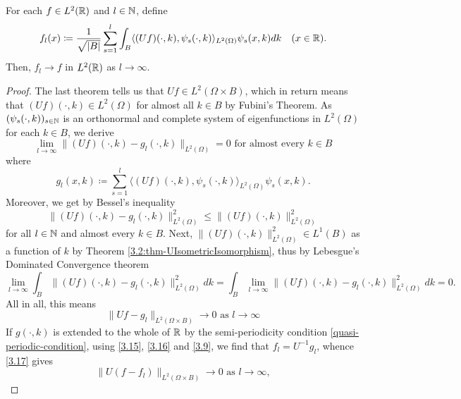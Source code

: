 \begin{theorem} \label{3.3:thm-flConvergence}
		For each $f \in L^{2}(\mathbb{R})$ and $l \in \mathbb{N}$, define
			\begin{equation}
				f_{l}(x) \coloneqq \frac{1}{\sqrt{|B|}} \sum_{s=1}^{l} \int_{B} \langle (Uf)(\cdot, k), \psi_{s}(\cdot, k) \rangle_{L^{2}(\Omega)} \psi_{s}(x, k) dk \quad (x \in \mathbb{R}). \label{3.15}
			\end{equation}
		Then, $f_{l} \rightarrow f$ in $L^{2}(\mathbb{R})$ as $l \rightarrow \infty$.

	\begin{proof}
		The last theorem tells us that $Uf \in L^{2}(\Omega \times B)$, which in return means that $(Uf)(\cdot, k) \in L^{2}(\Omega)$ for almost all $k \in B$ by Fubini's Theorem. As $(\psi_{s}(\cdot, k))_{s \in \mathbb{N}}$ is an orthonormal and complete system of eigenfunctions in $L^{2}(\Omega)$ for each $k \in B$, we derive
			\[ \lim_{l \rightarrow \infty} \| (Uf)(\cdot, k) - g_{l}(\cdot, k) \|_{L^{2}(\Omega)} = 0 \text{ for almost every } k \in B \]
		where 
			\begin{equation}
				g_{l}(x, k) \coloneqq \sum_{s=1}^{l} \langle(Uf)(\cdot, k), \psi_{s}(\cdot,k)\rangle_{L^{2}(\Omega)} \psi_{s}(x,k). \label{3.16}
			\end{equation}
		Moreover, we get by Bessel's inequality
			\[ \| (Uf)(\cdot, k) - g_{l}(\cdot, k) \|^{2}_{L^{2}(\Omega)} \leq \| (Uf)(\cdot, k) \|^{2}_{L^{2}(\Omega)}  \]
		for all $l \in \mathbb{N}$ and almost every $k \in B$. Next, $\|(Uf)(\cdot, k)\|^{2}_{L^{2}(\Omega)} \in L^{1}(B)$ as a function of $k$ by Theorem \ref{3.2:thm-UIsometricIsomorphism}, thus by Lebesgue's Dominated Convergence theorem
		\[ \lim_{l \rightarrow \infty} \int_{B} \| (Uf)(\cdot, k) - g_{l}(\cdot, k) \|^{2}_{L^{2}(\Omega)} dk  = \int_{B} \lim_{l \rightarrow \infty}  \| (Uf)(\cdot, k) - g_{l}(\cdot, k) \|^{2}_{L^{2}(\Omega)} dk = 0. \]
		  All in all, this means
			\begin{equation}
				\| U f - g_{l} \|_{L^{2}(\Omega \times B)} \rightarrow 0 \text{ as } l \rightarrow \infty \label{3.17}
			\end{equation} 
		 If $g(\cdot, k)$ is extended to the whole of $\mathbb{R}$ by the semi-periodicity condition \eqref{quasi-periodic-condition}, using \eqref{3.15}, \eqref{3.16} and \eqref{3.9}, we find that $f_{l} = U^{-1}g_{l}$, whence \eqref{3.17} gives
			\[ \| U(f - f_{l}) \|_{L^{2}(\Omega \times B)} \rightarrow 0 \text{ as } l \rightarrow \infty,\]
	\end{proof}
\end{theorem}